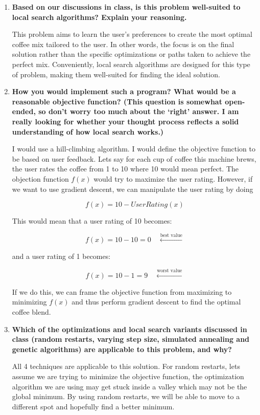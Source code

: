 \documentclass[a4paper]{article}
\begin{document}
\begin{sloppypar}
\begin{enumerate}[start=9,label=Q\arabic*,left=0pt]
    \item \textbf{Based on our discussions in class, is this problem well-suited to local search algorithms? Explain your reasoning.}
    \par This problem aims to learn the user’s preferences to create the most optimal coffee mix tailored to the user. 
    In other words, the focus is on the final solution rather than the specific optimizations or paths taken to achieve the perfect mix. 
    Conveniently, local search algorithms are designed for this type of problem, making them well-suited for finding the ideal solution.
    
    \item \textbf{How you would implement such a program? What would be a reasonable objective function? (This question is somewhat open-ended, so don’t worry too much about the ‘right’ answer. I am really looking for whether your thought process reflects a solid understanding of how local search works.)}
    \par I would use a hill-climbing algorithm. I would define the objective function to be based on user feedback.
    Lets say for each cup of coffee this machine brews, the user rates the coffee from 1 to 10 where 10 would mean perfect.
    The objection function $f(x)$ would try to maximize the user rating. However, if we want to use gradient descent, we can manipulate the 
    user rating by doing 
    
    \[f(x) = 10 - User Rating(x)\]

    This would mean that a user rating of 10 becomes:

    \[ f(x) = 10 - 10 = 0 \quad \xleftarrow{\text{best value}} \]

    and a user rating of 1 becomes:

    \[ f(x) = 10 - 1 = 9 \quad \xleftarrow{\text{worst value}} \]

    If we do this, we can frame the objective function from maximizing to minimizing $f(x)$ and thus perform gradient descent
    to find the optimal coffee blend.

    \item \textbf{Which of the optimizations and local search variants discussed in class (random restarts, varying step size, simulated annealing and genetic algorithms) are applicable to this problem, and why?}
    \par All 4 techniques are applicable to this solution. For random restarts, lets assume we are trying to minimize the objective
    function, the optimization algorithm we are using may get stuck inside a valley which may not be the global minimum. By using random
    restarts, we will be able to move to a different spot and hopefully find a better minimum.


\end{enumerate}
\end{sloppypar}
\end{document}
